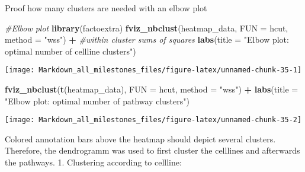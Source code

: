 \documentclass[]{article}
\newenvironment{Shaded}{\begin{snugshade}}{\end{snugshade}}
\newcommand{\CommentTok}[1]{\textcolor[rgb]{0.56,0.35,0.01}{\textit{#1}}}
\newcommand{\DataTypeTok}[1]{\textcolor[rgb]{0.13,0.29,0.53}{#1}}
\newcommand{\KeywordTok}[1]{\textcolor[rgb]{0.13,0.29,0.53}{\textbf{#1}}}
\newcommand{\NormalTok}[1]{#1}
\newcommand{\OperatorTok}[1]{\textcolor[rgb]{0.81,0.36,0.00}{\textbf{#1}}}
\newcommand{\StringTok}[1]{\textcolor[rgb]{0.31,0.60,0.02}{#1}}
\begin{document}
Proof how many clusters are needed with an elbow plot

\begin{Shaded}
\begin{Highlighting}[]
\CommentTok{#Elbow plot}
\KeywordTok{library}\NormalTok{(factoextra)}
\KeywordTok{fviz_nbclust}\NormalTok{(heatmap_data, }
             \DataTypeTok{FUN =}\NormalTok{ hcut, }
             \DataTypeTok{method =} \StringTok{"wss"}\NormalTok{) }\OperatorTok{+}\StringTok{ }\CommentTok{#within cluster sums of squares}
\StringTok{  }\KeywordTok{labs}\NormalTok{(}\DataTypeTok{title =} \StringTok{"Elbow plot: optimal number of cellline clusters"}\NormalTok{)}
\end{Highlighting}
\end{Shaded}

\begin{center}\texttt{[image: Markdown\_all\_milestones\_files/figure-latex/unnamed-chunk-35-1]} \end{center}

\begin{Shaded}
\begin{Highlighting}[]
\KeywordTok{fviz_nbclust}\NormalTok{(}\KeywordTok{t}\NormalTok{(heatmap_data), }
             \DataTypeTok{FUN =}\NormalTok{ hcut, }
             \DataTypeTok{method =} \StringTok{"wss"}\NormalTok{) }\OperatorTok{+}
\StringTok{  }\KeywordTok{labs}\NormalTok{(}\DataTypeTok{title =} \StringTok{"Elbow plot: optimal number of pathway clusters"}\NormalTok{)}
\end{Highlighting}
\end{Shaded}

\begin{center}\texttt{[image: Markdown\_all\_milestones\_files/figure-latex/unnamed-chunk-35-2]} \end{center}

Colored annotation bars above the heatmap should depict several
clusters. Therefore, the dendrogramm was used to first cluster the
celllines and afterwards the pathways. 1. Clustering according to
cellline:
\end{document}
